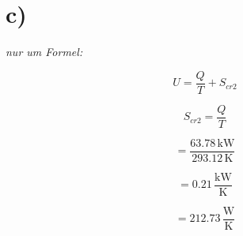 

\section*{c)}

\textit{nur um Formel:}

\[
U = \frac{Q}{T} + S_{cr2}
\]

\[
S_{cr2} = \frac{Q}{T}
\]

\[
= \frac{63.78 \, \text{kW}}{293.12 \, \text{K}}
\]

\[
= 0.21 \, \frac{\text{kW}}{\text{K}}
\]

\[
= 212.73 \, \frac{\text{W}}{\text{K}}
\]